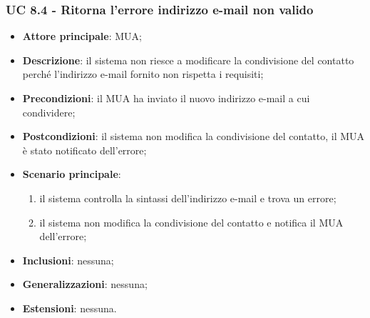     \subsubsection{UC 8.4 - Ritorna l'errore indirizzo e-mail non valido} \label{sec:UC8.4}
    \begin{itemize}
        \item \textbf{Attore principale}: MUA;
        \item \textbf{Descrizione}: il sistema non riesce a modificare la condivisione del contatto perché l'indirizzo e-mail fornito non rispetta i requisiti;
        \item \textbf{Precondizioni}: il MUA ha inviato il nuovo indirizzo e-mail a cui condividere;
        \item \textbf{Postcondizioni}: il sistema non modifica la condivisione del contatto, il MUA è stato notificato dell'errore;
        \item \textbf{Scenario principale}:
            \begin{enumerate}
                \item il sistema controlla la sintassi dell'indirizzo e-mail e trova un errore;
                \item il sistema non modifica la condivisione del contatto e notifica il MUA dell'errore;
            \end{enumerate}
        \item \textbf{Inclusioni}: nessuna;
        \item \textbf{Generalizzazioni}: nessuna;
        \item \textbf{Estensioni}: nessuna.
    \end{itemize}
